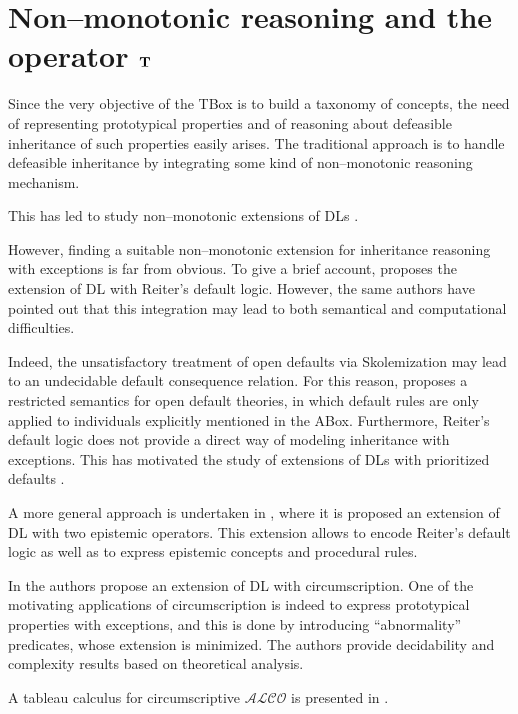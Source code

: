 \documentclass[a4paper, 11pt, oneside]{duthesis}
\newcommand{\tip}{{\bf T}}
\begin{document}
\newpage

\section{Non--monotonic reasoning and the operator $\tip$}\label{nonmonotonic_reasoning}
Since the very objective of the TBox is to build a taxonomy of concepts, the need of representing prototypical properties and of reasoning about defeasible inheritance of such properties easily arises.
The traditional approach is to handle defeasible inheritance by integrating some kind of non--monotonic reasoning mechanism.

This has led to study non--monotonic extensions of DLs \cite{baader95a, baader95b, bonattilutzwolterkr06, casinistraccia2010, donini98, donini2002, eiter2004, straccia93}.

However, finding a suitable non--monotonic extension for inheritance reasoning with exceptions is far from obvious.
To give a brief account, \cite{baader95a} proposes the extension of DL with Reiter's default logic.
However, the same authors have pointed out that this integration may lead to both semantical and computational difficulties.

Indeed, the unsatisfactory treatment of open defaults via Skolemization may lead to an undecidable default consequence relation. For this reason, \cite{baader95a} proposes a restricted semantics for open default theories, in which default rules are only applied to individuals explicitly mentioned in the ABox.
Furthermore, Reiter's default logic does not provide a direct way of modeling inheritance with exceptions.
This has motivated the study of extensions of DLs with prioritized defaults
\cite{straccia93,baader95b}.

A more general approach is undertaken in \cite{donini2002}, where it is proposed an extension of DL with two epistemic operators. This extension allows to encode Reiter's default logic as well as to express epistemic concepts and procedural rules.

In \cite{bonattilutz} the authors propose an extension of DL with circumscription. One of the motivating applications of circumscription is indeed to express prototypical properties with exceptions, and this is done by introducing ``abnormality'' predicates, whose extension is minimized.
The authors provide decidability and complexity results based on theoretical analysis.

A tableau calculus for circumscriptive $\mathcal{ALCO}$ is presented in \cite{hitzlertableau}.
\end{document}
